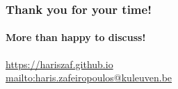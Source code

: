 \documentclass{beamer}
\begin{document}
   \begin{darkframes}


      \begin{frame}

         \frametitle{Thank you for your time!}
         \framesubtitle{More than happy to discuss!}

         \href{https://hariszaf.github.io}{https://hariszaf.github.io} \\
         \href{mailto:haris.zafeiropoulos@kuleuven.be}{mailto:haris.zafeiropoulos@kuleuven.be}

      \end{frame}







\end{darkframes}
\end{document}
